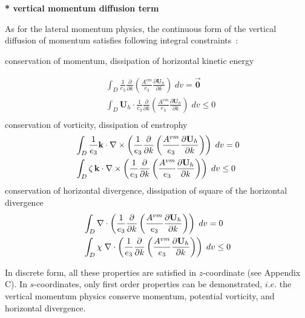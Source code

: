 \documentclass[../main/NEMO_manual]{subfiles}
\begin{document}
\textbf{* vertical momentum diffusion term}

As for the lateral momentum physics, the continuous form of the vertical diffusion of
momentum satisfies following integral constraints~:

conservation of momentum, dissipation of horizontal kinetic energy

\[
  \begin{aligned}
    & \int_D {\frac{1}{e_3 }}  \frac{\partial }{\partial k}\left( \frac{A^{vm}}{e_3 }\frac{\partial {\textbf{U}}_h }{\partial k} \right) \;dv = \overrightarrow{\textbf{0}} \\
    & \int_D \textbf{U}_h \cdot \frac{1}{e_3} \frac{\partial}{\partial k} \left( {\frac{A^{vm}}{e_3 }}{\frac{\partial \textbf{U}_h }{\partial k}} \right) \;dv \leq 0 \\
  \end{aligned}
\]
conservation of vorticity, dissipation of enstrophy
\[
  \begin{aligned}
    & \int_D {\frac{1}{e_3 }{\rm {\bf k}}\cdot \nabla \times \left( {\frac{1}{e_3
          }\frac{\partial }{\partial k}\left( {\frac{A^{vm}}{e_3 }\frac{\partial {\rm
                  {\bf U}}_h }{\partial k}} \right)} \right)\;dv} =0 \\
    & \int_D {\zeta \,{\rm {\bf k}}\cdot \nabla \times \left( {\frac{1}{e_3
          }\frac{\partial }{\partial k}\left( {\frac{A^{vm}}{e_3 }\frac{\partial {\rm
                  {\bf U}}_h }{\partial k}} \right)} \right)\;dv} \leq 0 \\
  \end{aligned}
\]
conservation of horizontal divergence, dissipation of square of the horizontal divergence
\[
  \begin{aligned}
    &\int_D {\nabla \cdot \left( {\frac{1}{e_3 }\frac{\partial }{\partial
            k}\left( {\frac{A^{vm}}{e_3 }\frac{\partial {\rm {\bf U}}_h }{\partial k}}
          \right)} \right)\;dv} =0 \\
    & \int_D {\chi \;\nabla \cdot \left( {\frac{1}{e_3 }\frac{\partial }{\partial
            k}\left( {\frac{A^{vm}}{e_3 }\frac{\partial {\rm {\bf U}}_h }{\partial k}}
          \right)} \right)\;dv} \leq 0 \\
  \end{aligned}
\]

In discrete form, all these properties are satisfied in $z$-coordinate (see Appendix C).
In $s$-coordinates, only first order properties can be demonstrated,
$i.e.$ the vertical momentum physics conserve momentum, potential vorticity, and horizontal divergence.
\end{document}
